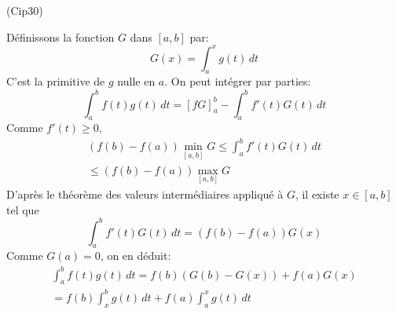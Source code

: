 \begin{tiny}(Cip30)\end{tiny} Définissons la fonction $G$ dans $[a,b]$ par:
\begin{displaymath}
 G(x)=\int_a^xg(t)\,dt
\end{displaymath}
C'est la primitive de $g$ nulle en $a$. On peut intégrer par parties:
\begin{displaymath}
 \int_a^bf(t)g(t)\,dt = \left[fG \right]_a^b-\int_a^bf'(t)G(t)\,dt 
\end{displaymath}
Comme $f'(t)\geq0$,
\begin{multline*}
 (f(b)-f(a))\min_{[a,b]}G\leq\int_a^bf'(t)G(t)\,dt \\
\leq (f(b)-f(a))\max_{[a,b]}G
\end{multline*}
D'après le théorème des valeurs intermédiaires appliqué à $G$, il existe $x\in[a,b]$ tel que
\begin{displaymath}
 \int_a^bf'(t)G(t)\,dt = (f(b)-f(a))G(x)
\end{displaymath}
Comme $G(a)=0$, on en déduit:
\begin{multline*}
\int_a^bf(t)g(t)\,dt = f(b)(G(b)-G(x)) +f(a)G(x) \\
= f(b)\int_x^bg(t)\,dt + f(a)\int_a^xg(t)\,dt
\end{multline*}
